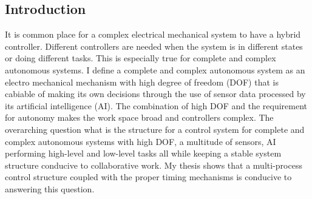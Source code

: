 \subsection{Introduction}



It is common place for a complex electrical mechanical system to have a hybrid controller.  
Different controllers are needed when the system is in different states or doing different tasks.
This is especially true for complete and complex autonomous systems.
I define a complete and complex autonomous system as an electro mechanical mechanism with high degree of freedom (DOF) that is cabiable of making its own decisions through the use of sensor data processed by its artificial intelligence (AI).
The combination of high DOF and the requirement for autonomy makes the work space broad and controllers complex.
The overarching question what is the structure for a control system for complete and complex autonomous systems with high DOF, a multitude of sensors, AI performing high-level and low-level tasks all while keeping a stable system structure conducive to collaborative work.
My thesis shows that a multi-process control structure coupled with the proper timing mechanisms is conducive to answering this question.





